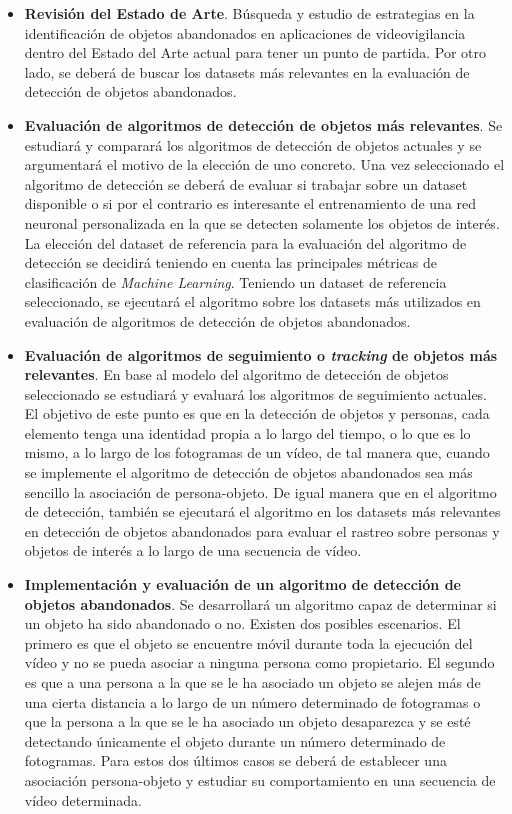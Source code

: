 \begin{itemize}
    \item \textbf{Revisión del Estado de Arte}. Búsqueda y estudio de estrategias en la identificación de objetos abandonados en aplicaciones de videovigilancia dentro del Estado del Arte actual para tener un punto de partida. Por otro lado, se deberá de buscar los datasets más relevantes en la evaluación de detección de objetos abandonados.
    \item \textbf{Evaluación de algoritmos de detección de objetos más relevantes}. Se estudiará y comparará los algoritmos de detección de objetos actuales y se argumentará el motivo de la elección de uno concreto. Una vez seleccionado el algoritmo de detección se deberá de evaluar si trabajar sobre un dataset disponible o si por el contrario es interesante el entrenamiento de una red neuronal personalizada en la que se detecten solamente los objetos de interés. La elección del dataset de referencia para la evaluación del algoritmo de detección se decidirá teniendo en cuenta las principales métricas de clasificación de \textit{Machine Learning}. Teniendo un dataset de referencia seleccionado, se ejecutará el algoritmo sobre los datasets más utilizados en evaluación de algoritmos de detección de objetos abandonados.
    \item \textbf{Evaluación de algoritmos de seguimiento o \textit{tracking} de objetos más relevantes}. En base al modelo del algoritmo de detección de objetos seleccionado se estudiará y evaluará los algoritmos de seguimiento actuales. El objetivo de este punto es que en la detección de objetos y personas, cada elemento tenga una identidad propia a lo largo del tiempo, o lo que es lo mismo, a lo largo de los fotogramas de un vídeo, de tal manera que, cuando se implemente el algoritmo de detección de objetos abandonados sea más sencillo la asociación de persona-objeto. De igual manera que en el algoritmo de detección, también se ejecutará el algoritmo en los datasets más relevantes en detección de objetos abandonados para evaluar el rastreo sobre personas y objetos de interés a lo largo de una secuencia de vídeo.
    \item \textbf{Implementación y evaluación de un algoritmo de detección de objetos abandonados}. Se desarrollará un algoritmo capaz de determinar si un objeto ha sido abandonado o no. Existen dos posibles escenarios. El primero es que el objeto se encuentre móvil durante toda la ejecución del vídeo y no se pueda asociar a ninguna persona como propietario. El segundo es que a una persona a la que se le ha asociado un objeto se alejen más de una cierta distancia a lo largo de un número determinado de fotogramas o que la persona a la que se le ha asociado un objeto desaparezca y se esté detectando únicamente el objeto durante un número determinado de fotogramas. Para estos dos últimos casos se deberá de establecer una asociación persona-objeto y estudiar su comportamiento en una secuencia de vídeo determinada.
\end{itemize}

